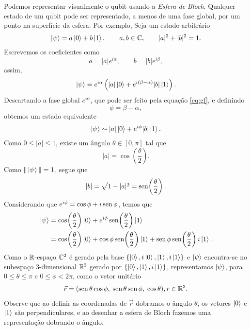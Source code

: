 Podemos representar visualmente o qubit usando a \emph{Esfera de Bloch}. Qualquer estado de um qubit pode ser representado, a menos de uma fase global,
por um ponto na superfície da esfera. Por exemplo, Seja um estado arbitrário 
\begin{equation}
\ket{\psi} = a\ket{0} + b\ket{1},
\qquad a,b \in \mathbb{C},
\qquad |a|^2 + |b|^2 = 1.
\end{equation}
Escrevemos os coeficientes como
\begin{equation}
a = |a| e^{i\alpha}, \qquad b = |b| e^{i\beta},
\end{equation}
assim,
\begin{equation}
\ket{\psi}
= e^{i\alpha}\left(|a|\ket{0} + e^{i(\beta-\alpha)}|b|\ket{1}\right).
\end{equation}
Descartando a fase global $e^{i\alpha}$, que pode ser feito pela equação \eqref{eq:gf}, e definindo
$$
\phi = \beta - \alpha,
$$
obtemos um estado equivalente
\begin{equation}
\ket{\psi}
\sim |a|\ket{0} + e^{i\phi}|b|\ket{1}.
\end{equation}
Como $0 \le |a| \le 1$, existe um ângulo $\theta \in [0,\pi]$ tal que
\begin{equation}
|a| = \cos\!\left(\frac{\theta}{2}\right).
\end{equation}
Como $\|\ket{\psi}\|=1$, segue que
\begin{equation}
|b| = \sqrt{1-|a|^2} = \operatorname{sen}\!\left(\frac{\theta}{2}\right).
\end{equation}
Considerando que $e^{i\phi}=\cos \phi + i\operatorname{sen} \phi$, temos que
\begin{align}
\ket{\psi} &= \cos\!\left(\frac{\theta}{2}\right)\ket{0} + e^{i\phi}\operatorname{sen}\!\left(\frac{\theta}{2}\right)\ket{1} \\
           &= \cos\!\left(\frac{\theta}{2}\right)\ket{0} + \cos \phi \operatorname{sen}\!\left(\frac{\theta}{2}\right)\ket{1} + \operatorname{sen} \phi \operatorname{sen}\!\left(\frac{\theta}{2}\right)i\ket{1}.
\end{align}
Como o $\mathbb{R}$-espaço $\mathbb{C}^2$ é gerado pela base $\{\ket{0}, i\ket{0}, \ket{1}, i\ket{1}\}$ e $\ket{\psi}$ encontra-se no subespaço $3$-dimensional $\mathbb{R}^3$ gerado por $\{\ket{0}, \ket{1}, i\ket{1}\}$, representamos $\ket{\psi}$, para $0 \le \theta \le \pi$ e $0 \le \phi < 2\pi$, como o vetor unitário
$$
\vec r = (\operatorname{sen}\theta\cos\phi,\; \operatorname{sen}\theta\operatorname{sen}\phi,\; \cos\theta), r\in \mathbb{R}^3.
$$
Observe que ao definir as coordenadas de $\vec r$ dobramos o ângulo $\theta$, os vetores $\ket{0}$ e $\ket{1}$ são perpendiculares, e ao desenhar a esfera de Bloch fazemos uma representação dobrando o ângulo.

